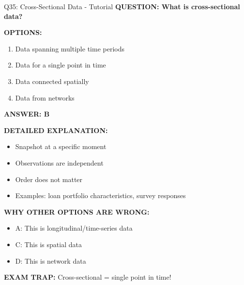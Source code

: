 \documentclass[8pt]{beamer}
\begin{document}
	\begin{frame}{Q35: Cross-Sectional Data - Tutorial}
		\fontsize{6.5}{7.5}\selectfont
		\textbf{QUESTION: What is cross-sectional data?}
		
		\vspace{0.1cm}
		\textbf{OPTIONS:}
		\begin{enumerate}
			\item Data spanning multiple time periods
			\item Data for a single point in time
			\item Data connected spatially
			\item Data from networks
		\end{enumerate}
		
		\vspace{0.1cm}
		\textcolor{myblue}{\textbf{ANSWER: B}}
		
		\vspace{0.1cm}
		\textbf{DETAILED EXPLANATION:}
		\begin{itemize}
			\item Snapshot at a specific moment
			\item Observations are independent
			\item Order does not matter
			\item Examples: loan portfolio characteristics, survey responses
		\end{itemize}
		
		\vspace{0.1cm}
		\textcolor{myred}{\textbf{WHY OTHER OPTIONS ARE WRONG:}}
		\begin{itemize}
			\item \textcolor{myred}{A:} This is longitudinal/time-series data
			\item \textcolor{myred}{C:} This is spatial data
			\item \textcolor{myred}{D:} This is network data
		\end{itemize}
		
		\textcolor{myred}{\textbf{EXAM TRAP:}} Cross-sectional = \textcolor{myblue}{single point in time}!
	\end{frame}
	
\end{document}
